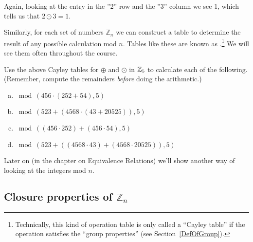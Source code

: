 \noindent
Again, looking at the entry in the ''2'' row and the ''3'' column we see 1, which tells us that $2 \odot 3 = 1$.

Similarly, for each set of numbers ${\mathbb Z}_n$ we can construct a table to determine the result of any possible calculation mod $n$.
Tables like these are  known as .\footnote{Technically, this kind of operation table is only called a ``Cayley table'' if the operation satisfies the ``group properties'' (see Section~\ref{DefOfGroup}). }  We will see them often throughout the course.

\begin{exercise}{49}
Use the above Cayley tables for $\oplus$ and $\odot$  in $\mathbb{Z}_5$ to calculate each of the following.  (Remember, compute the remainders \emph{before} doing the arithmetic.)

\begin{enumerate}[(a)]
\item
$ \bmod(456 \cdot (252 + 54),5) $
\item
$ \bmod(523 + \left( 4568 \cdot (43 + 20525) \right),5)$
\item
$\bmod((456 \cdot 252) + (456 \cdot 54),5) $
\item
$ \bmod(523 + \left( (4568 \cdot 43) + (4568 \cdot 20525) \right) ,5)$
\end{enumerate}
\end{exercise}



\noindent
Later on (in the chapter on Equivalence Relations) we'll show another way of looking at the integers mod $n$.

\subsection{Closure properties of ${\mathbb Z}_n$}\label{sec:ClosureZn}

